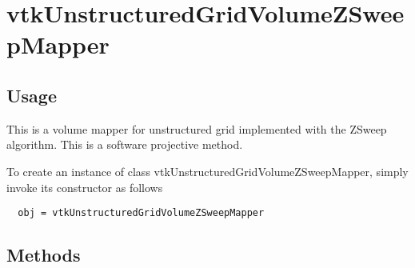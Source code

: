 \section{vtkUnstructuredGridVolumeZSweepMapper}

\subsection{Usage}

 This is a volume mapper for unstructured grid implemented with the ZSweep
 algorithm. This is a software projective method.

To create an instance of class vtkUnstructuredGridVolumeZSweepMapper, simply
invoke its constructor as follows
\begin{verbatim}
  obj = vtkUnstructuredGridVolumeZSweepMapper
\end{verbatim}
\subsection{Methods}

